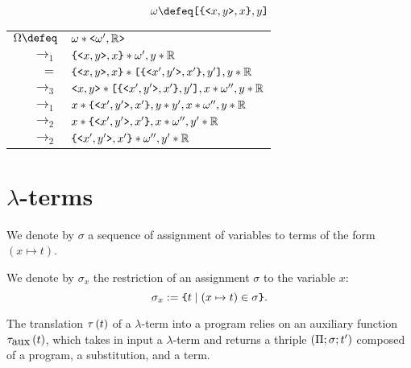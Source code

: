 \documentclass{article}
\begin{document}
\begin{example}

\[\omega \defeq \cs{\contr{\ca{x}{y}, x}}{y}\]

\bgroup
\def\arraystretch{1.3}
\begin{tabular}{rl}
    $\Omega \defeq $ & $\omega * \mbox{\texttt{<}} \omega', \mathbb{R}\mbox{\texttt{>}}$ \\
    $\to_1$ & $\mbox{\texttt{\{}}\mbox{\texttt{<}} x, y\mbox{\texttt{>}}, x\mbox{\texttt{\}}} * \omega', y * \mathbb{R}$ \\
    $=$ & $\mbox{\texttt{\{}}\mbox{\texttt{<}} x, y\mbox{\texttt{>}}, x\mbox{\texttt{\}}} * \mbox{\texttt{[}}\mbox{\texttt{\{}}\mbox{\texttt{<}} x', y'\mbox{\texttt{>}}, x'\mbox{\texttt{\}}}, y'\mbox{\texttt{]}}, y * \mathbb{R}$ \\
    $\to_3$ & $\mbox{\texttt{<}} x, y\mbox{\texttt{>}} * \mbox{\texttt{[}}\mbox{\texttt{\{}}\mbox{\texttt{<}} x', y'\mbox{\texttt{>}}, x'\mbox{\texttt{\}}}, y'\mbox{\texttt{]}}, x * \omega'', y * \mathbb{R}$ \\
    $\to_1$ & $x * \mbox{\texttt{\{}}\mbox{\texttt{<}} x', y'\mbox{\texttt{>}}, x'\mbox{\texttt{\}}}, {y}*{y'}, x * \omega'', y * \mathbb{R}$ \\
    $\to_2$ & $x * \mbox{\texttt{\{}}\mbox{\texttt{<}} x', y'\mbox{\texttt{>}}, x'\mbox{\texttt{\}}}, x * \omega'', y' * \mathbb{R}$ \\
    $\to_2$ & $\mbox{\texttt{\{}}\mbox{\texttt{<}} x', y'\mbox{\texttt{>}}, x'\mbox{\texttt{\}}} * \omega'', y' * \mathbb{R}$ \\
\end{tabular}
\egroup
\end{example}

\vspace{2em}


\section{$\lambda$-terms}

We denote by $\sigma$ a sequence of assignment of variables to terms
of the form $(x \mapsto t)$.

We denote by $\sigma_x$ the restriction of an assignment $\sigma$
to the variable $x$:
\[\sigma_x := \mbox{\texttt{\{}}t \mid (x \mapsto t) \in \sigma\mbox{\texttt{\}}}.\]

The translation $\tau\left(t\right)$ of a $\lambda$-term into a program relies on an auxiliary function $\tau_{\mbox{aux}}\left(t\right)$, which takes
in input a $\lambda$-term and returns a thriple $(\Pi; \sigma; t')$ composed of a program, a substitution, and a term.
\end{document}
